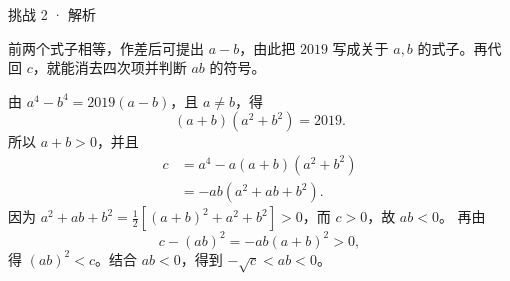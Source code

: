 
\begin{solution}[before skip=4pt plus 1pt,after skip=4pt plus 1pt,top=6pt,bottom=6pt]{挑战 2 · 解析}

\think 前两个式子相等，作差后可提出 $a-b$，由此把 $2019$ 写成关于 $a,b$ 的式子。再代回 $c$，就能消去四次项并判断 $ab$ 的符号。

\solve 由 $a^4-b^4=2019(a-b)$，且 $a\ne b$，得
\[(a+b)(a^2+b^2)=2019.\]
所以 $a+b>0$，并且
\begin{align*}
c&=a^4-a(a+b)(a^2+b^2)\\
&=-ab(a^2+ab+b^2).
\end{align*}
因为 $a^2+ab+b^2=\frac12[(a+b)^2+a^2+b^2]>0$，而 $c>0$，故 $ab<0$。
再由
\[c-(ab)^2=-ab(a+b)^2>0,\]
得 $(ab)^2<c$。结合 $ab<0$，得到 $-\sqrt c<ab<0$。


\end{solution}
